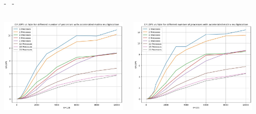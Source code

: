 \documentclass[compress]{beamer}
\begin{document}
\begin{frame}{\secname \text{ }- \subsecname\ \text{ }- \subsubsecname}
\begin{columns}
\begin{minipage}{0.75\textwidth}
\begin{adjustbox}{margin=1cm 0cm 0cm 0cm, center}
                \end{adjustbox}
            \end{minipage}
    \end{columns}
    \begin{columns}
            \begin{minipage}{0.75\textwidth}
                \centering
                \begin{adjustbox}{margin=2cm 0cm 0cm 0cm, center} %
                    \includegraphics[width=1.1\textwidth, frame]{resources/mpi_cuda_128.jpg}
                \end{adjustbox}
            \end{minipage}
            \begin{minipage}{0.75\textwidth}
                \centering
                \begin{adjustbox}{margin=1cm 0cm 0cm 0cm, center} %
                    \includegraphics[width=1.1\textwidth, frame]{resources/mpi_cuda_156.jpg}

\end{adjustbox}
\end{minipage}
\end{columns}
\end{frame}
\end{document}
